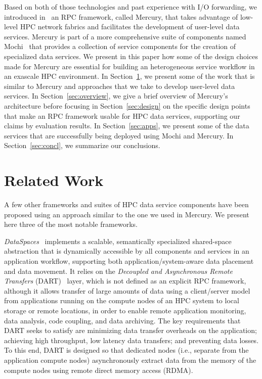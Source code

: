 \documentclass[11pt]{article}
\begin{document}
Based on both of those technologies and past experience with I/O forwarding,
we introduced in~\cite{Soumagne2013} an RPC framework, called Mercury, that takes
advantage of low-level HPC network fabrics and facilitates the development
of user-level data services. Mercury is part of a more comprehensive suite of components named
Mochi~\cite{Ross2020} that provides
a collection of service components for the creation of specialized data services.
We present in this paper how some of the design
choices made for Mercury are essential for building an heterogeneous service
workflow in an exascale HPC environment. In Section~\ref{sec:related}, we
present some of the work that
is similar to Mercury and approaches that we take to develop user-level data
services. In Section~\ref{sec:overview}, we give a brief overview of Mercury's
architecture before focusing in Section~\ref{sec:design} on the specific design
points that make an RPC framework usable for HPC data services, supporting our
claims by evaluation results. In Section~\ref{sec:apps}, we present some of the data services that are
successfully being deployed using Mochi and Mercury.
In Section~\ref{sec:concl}, we summarize our conclusions.

\section{Related Work}
\label{sec:related}

A few other frameworks and suites of HPC data service components have been proposed
using an approach similar to the one we used in Mercury. We present here
three of the most notable frameworks.

\textit{DataSpaces}~\cite{Docan2012} implements a
scalable, semantically specialized shared-space abstraction that is
dynamically accessible by all components and services in an application
workflow, supporting both application/system-aware data placement and data movement.
It relies on the \textit{Decoupled and Asynchronous Remote Transfers} (DART)~\cite{Docan2010}
layer, which is not defined as an explicit RPC framework, although it allows transfer of
large amounts of data using a client/server model from applications running on
the compute nodes of an HPC system to local storage or remote locations, in
order to enable remote application monitoring, data analysis, code coupling,
and data archiving.
The key requirements that DART seeks to satisfy are minimizing data transfer
overheads on the application; achieving high throughput, low latency data
transfers; and preventing data losses. To this end, DART is
designed so that dedicated nodes (i.e., separate from the application compute
nodes) asynchronously extract data from the memory of the compute nodes using
remote direct memory access (RDMA).
\end{document}
